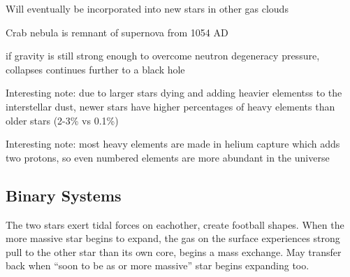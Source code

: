 Will eventually be incorporated into new stars in other gas clouds

Crab nebula is remnant of supernova from 1054 AD

if gravity is still strong enough to overcome neutron degeneracy pressure, collapses continues further to a black hole

Interesting note: due to larger stars dying and adding heavier elementss to the interstellar dust, newer stars have higher percentages of heavy elements than older stars (2-3\% vs 0.1\%)

Interesting note: most heavy elements are made in helium capture which adds two protons, so even numbered elements are more abundant in the universe

\subsection{Binary Systems}
The two stars exert tidal forces on eachother, create football shapes. When the more massive star begins to expand, the gas on the surface experiences strong pull to the other star than its own core, begins a mass exchange. May transfer back when ``soon to be as or more massive'' star begins expanding too.
